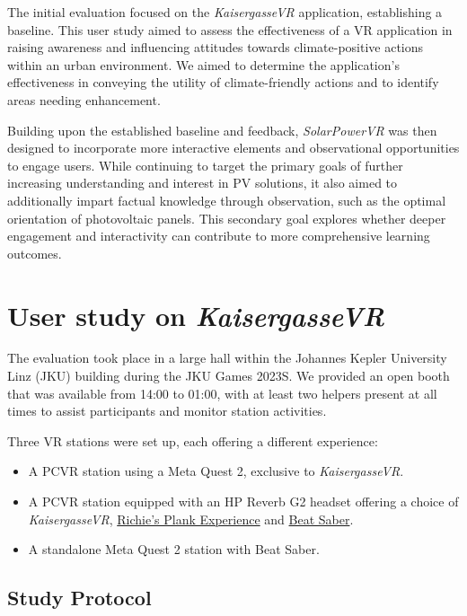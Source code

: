 \documentclass[draft, final]{vutinfth} %
\begin{document}
The initial evaluation focused on the \textit{KaisergasseVR} application, establishing a baseline. This user study aimed to assess the effectiveness of a VR application in raising awareness and influencing attitudes towards climate-positive actions within an urban environment. We aimed to determine the application's effectiveness in conveying the utility of climate-friendly actions and to identify areas needing enhancement.

Building upon the established baseline and feedback, \textit{SolarPowerVR} was then designed to incorporate more interactive elements and observational opportunities to engage users. While continuing to target the primary goals of further increasing understanding and interest in PV solutions, it also aimed to additionally impart factual knowledge through observation, such as the optimal orientation of photovoltaic panels. This secondary goal explores whether deeper engagement and interactivity can contribute to more comprehensive learning outcomes.


\section{User study on \textit{KaisergasseVR}}
\label{sec:user_study_kaisergassevr}

The evaluation took place in a large hall within the Johannes Kepler University Linz (JKU) building during the JKU Games 2023S. We provided an open booth that was available from 14:00 to 01:00, with at least two helpers present at all times to assist participants and monitor station activities.

Three VR stations were set up, each offering a different experience:

\begin{itemize}
    \item A PCVR station using a Meta Quest 2, exclusive to \textit{KaisergasseVR}.
    \item A PCVR station equipped with an HP Reverb G2 headset offering a choice of \textit{KaisergasseVR}, \hyperlink{https://store.steampowered.com/app/517160/Richies_Plank_Experience/}{Richie's Plank Experience} and \hyperlink{https://store.steampowered.com/app/620980/Beat_Saber/}{Beat Saber}.
   \item A standalone Meta Quest 2 station with Beat Saber.
\end{itemize}

\subsection{Study Protocol}
\end{document}
